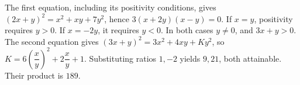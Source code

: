 The first equation, including its positivity conditions, gives $(2x+y)^2=x^2+xy+7y^2$, hence $3(x+2y)(x-y)=0$. If $x=y$, positivity requires $y>0$. If $x=-2y$, it requires $y<0$. In both cases $y\ne0$, and $3x+y>0$. The second equation gives $(3x+y)^2=3x^2+4xy+Ky^2$, so $K=6\left(\dfrac{x}{y}\right)^2+2\dfrac{x}{y}+1$. Substituting ratios $1,-2$ yields $9,21$, both attainable. Their product is $\boxed{189}$.
